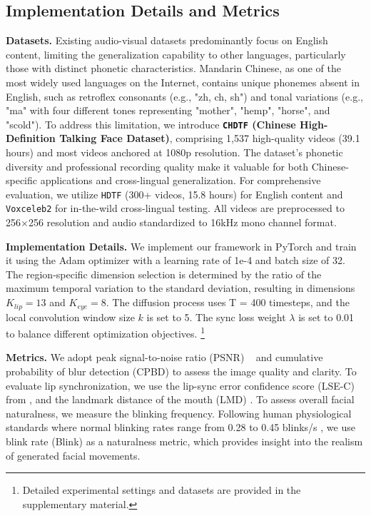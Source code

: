 \documentclass[conference]{IEEEtran}
\begin{document}
\subsection{Implementation Details and Metrics}
\noindent\textbf{Datasets.} Existing audio-visual datasets \cite{hdtf,vox2} predominantly focus on English content, limiting the generalization capability to other languages, particularly those with distinct phonetic characteristics. Mandarin Chinese, as one of the most widely used languages on the Internet, contains unique phonemes absent in English, such as retroflex consonants (e.g., "zh, ch, sh") and tonal variations (e.g., "ma" with four different tones representing "mother", "hemp", "horse", and "scold"). To address this limitation, we introduce \textbf{\texttt{CHDTF} (Chinese High-Definition Talking Face Dataset)}, comprising 1,537 high-quality videos (39.1 hours) and most videos anchored at 1080p resolution. The dataset's phonetic diversity and professional recording quality make it valuable for both Chinese-specific applications and cross-lingual generalization. For comprehensive evaluation, we utilize \texttt{HDTF} \cite{hdtf} (300+ videos, 15.8 hours) for English content and \texttt{Voxceleb2} \cite{vox2} for in-the-wild cross-lingual testing. All videos are preprocessed to 256×256 resolution and audio standardized to 16kHz mono channel format.

\noindent\textbf{Implementation Details.} We implement our framework in PyTorch and train it using the Adam optimizer with a learning rate of 1e-4 and batch size of 32. The region-specific dimension selection is determined by the ratio of the maximum temporal variation to the standard deviation, resulting in dimensions $K_{lip} = 13$ and $K_{eye} = 8$. The diffusion process uses T = 400 timesteps, and the local convolution window size $k$ is set to 5. The sync loss weight $\lambda$ is set to 0.01 to balance different optimization objectives. \footnote{Detailed experimental settings and datasets are provided in the supplementary material.}

\noindent\textbf{Metrics.} We adopt peak signal-to-noise ratio (PSNR) ~\cite{PSNR} and cumulative probability of blur detection (CPBD) \cite{cpbd} to assess the image quality and clarity. To evaluate lip synchronization, we use the lip-sync error confidence score (LSE-C) from \cite{syncnet}, and the landmark distance of the mouth (LMD) \cite{atvg}. To assess overall facial naturalness, we measure the blinking frequency. Following human physiological standards where normal blinking rates range from 0.28 to 0.45 blinks/s \cite{blink}, we use blink rate (Blink) as a naturalness metric, which provides insight into the realism of generated facial movements.
\end{document}
